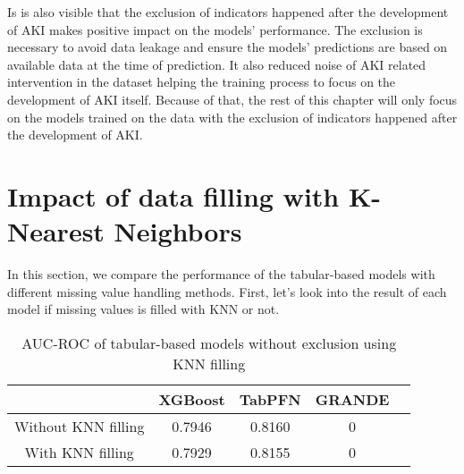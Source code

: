 \documentclass[../main.tex]{subfiles}
\begin{document}
Is is also visible that the exclusion of indicators happened after the development of AKI makes positive impact on the models' performance.
The exclusion is necessary to avoid data leakage and ensure the models' predictions are based on available data at the time of prediction.
It also reduced noise of AKI related intervention in the dataset helping the training process to focus on the development of AKI itself.
Because of that, the rest of this chapter will only focus on the models trained on the data with the exclusion of indicators happened after the development of AKI.


\section{Impact of data filling with K-Nearest Neighbors}

In this section, we compare the performance of the tabular-based models with different missing value handling methods.
First, let's look into the result of each model if missing values is filled with KNN or not.

\begin{table}[H]
    \centering
    \caption{AUC-ROC of tabular-based models without exclusion using KNN filling}
    \label{tab:knn_filling_no_limit}

    \begin{tabular}{|c|c|c|c|c|}
        \hline
        \textbf{} & 
        \textbf{XGBoost} & 
        \textbf{TabPFN} & 
        \textbf{GRANDE} \\
        \hline

        Without KNN filling & 
        0.7946 & 
        0.8160 & 
        0 \\

        With KNN filling & 
        0.7929 & 
        0.8155 & 
        0 \\

        \hline
    \end{tabular}

\end{table}
\end{document}
